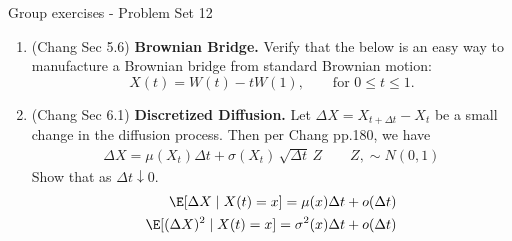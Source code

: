 \documentclass[10pt]{beamer}
\begin{document}
\begin{frame}{Group exercises - Problem Set 12}
\footnotesize  
\begin{enumerate}
	\item (Chang Sec 5.6)  \textbf{Brownian Bridge.} Verify that the below is an easy way to manufacture a Brownian bridge from standard Brownian motion:
	\[ X(t) = W(t)-t W(1), \qquad \text{for } 0 \leq t \leq 1.\]
\item (Chang Sec 6.1) \textbf{Discretized Diffusion.} Let $\Delta X = X_{t + \Delta t} - X_t$ be a small change in the diffusion process. Then per Chang pp.180, we have
	\begin{align*}
	 \Delta X = \mu(X_t) \Delta t + \sigma(X_t) \, \sqrt{\Delta t} \, Z  \qquad Z, \sim N(0,1)
	\end{align*}
	Show that as $\Delta t \downarrow 0$.
	\begin{align*}
	\E[\Delta X \mid X(t)=x] = \mu(x) \Delta t + o(\Delta t)\\	
	\E[(\Delta X)^2 \mid X(t)=x] = \sigma^2(x) \Delta t + o(\Delta t)
	\end{align*}

\end{enumerate}


\end{frame}
\end{document}
